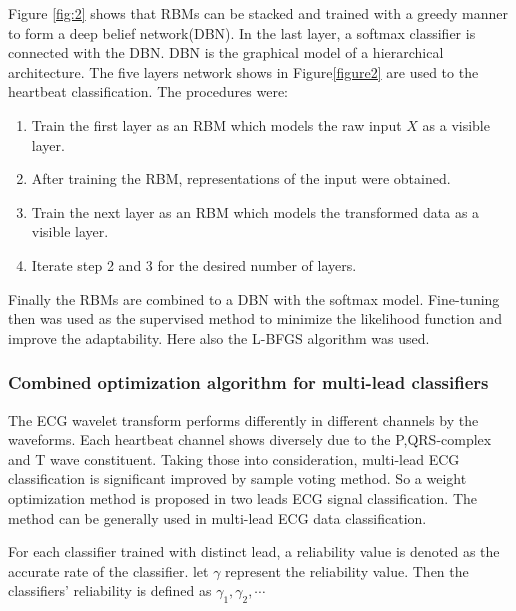 \documentclass[graybox]{svmult}
\begin{document}
Figure \ref{fig:2} shows that RBMs can be stacked and trained with a greedy manner to form a deep belief network(DBN)\cite{Juergen, Bengio2009}. In the last layer, a softmax classifier is connected with the DBN. DBN is the graphical model of a hierarchical architecture. The five layers network shows in Figure\ref{figure2} are used to the heartbeat classification. The procedures were:
\begin{enumerate}
\item Train the first layer as an RBM which models the raw input $X$ as a visible layer.
\item After training the RBM, representations of the input were obtained.
\item Train the next layer as an RBM which models the transformed data as a visible layer.
\item Iterate step 2 and 3 for the desired number of layers.
\end{enumerate}

Finally the RBMs are combined to a DBN with the softmax model. Fine-tuning then was used as the supervised method to minimize the likelihood function and improve the adaptability. Here also the L-BFGS algorithm was used.

\subsubsection{Combined optimization algorithm for multi-lead classifiers}
The ECG wavelet transform performs differently in different channels by the waveforms. Each heartbeat channel shows diversely due to the P,QRS-complex and T wave constituent. 
Taking those into consideration, multi-lead ECG classification is significant improved by sample voting method. So a weight optimization method is proposed in two leads ECG signal classification. 
The method can be generally used in multi-lead ECG data classification. 

For each classifier trained with distinct lead, a reliability value is denoted as the accurate rate of the classifier. let $\gamma$ represent the reliability value. Then the classifiers' reliability is defined as $\gamma_1, \gamma_2, \cdots$
\end{document}
